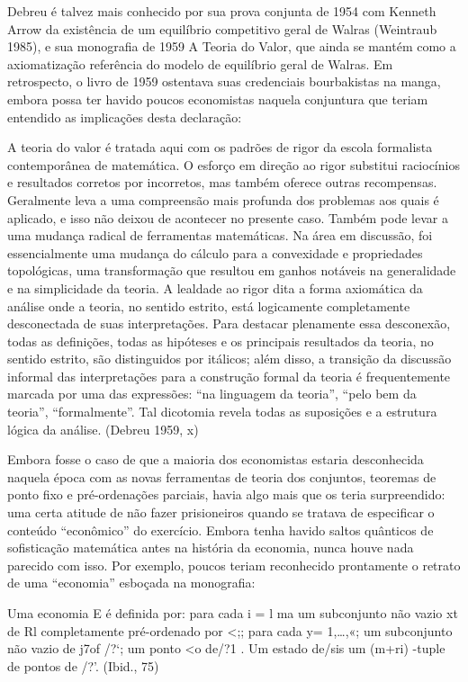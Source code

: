 \documentclass[a4paper,12pt]{article}[abntex2]
\begin{document}
Debreu é talvez mais conhecido por sua prova conjunta de 1954 com Kenneth Arrow da existência de um equilíbrio competitivo geral de Walras (Weintraub 1985), e sua monografia de 1959 A Teoria do Valor, que ainda se mantém como a axiomatização referência do modelo de equilíbrio geral de Walras. Em retrospecto, o livro de 1959 ostentava suas credenciais bourbakistas na manga, embora possa ter havido poucos economistas naquela conjuntura que teriam entendido as implicações desta declaração:

A teoria do valor é tratada aqui com os padrões de rigor da escola formalista contemporânea de matemática. O esforço em direção ao rigor substitui raciocínios e resultados corretos por incorretos, mas também oferece outras recompensas. Geralmente leva a uma compreensão mais profunda dos problemas aos quais é aplicado, e isso não deixou de acontecer no presente caso. Também pode levar a uma mudança radical de ferramentas matemáticas. Na área em discussão, foi essencialmente uma mudança do cálculo para a convexidade e propriedades topológicas, uma transformação que resultou em ganhos notáveis na generalidade e na simplicidade da teoria. A lealdade ao rigor dita a forma axiomática da análise onde a teoria, no sentido estrito, está logicamente completamente desconectada de suas interpretações. Para destacar plenamente essa desconexão, todas as definições, todas as hipóteses e os principais resultados da teoria, no sentido estrito, são distinguidos por itálicos; além disso, a transição da discussão informal das interpretações para a construção formal da teoria é frequentemente marcada por uma das expressões: “na linguagem da teoria”, “pelo bem da teoria”, “formalmente”. Tal dicotomia revela todas as suposições e a estrutura lógica da análise. (Debreu 1959, x)

Embora fosse o caso de que a maioria dos economistas estaria desconhecida naquela época com as novas ferramentas de teoria dos conjuntos, teoremas de ponto fixo e pré-ordenações parciais, havia algo mais que os teria surpreendido: uma certa atitude de não fazer prisioneiros quando se tratava de especificar o conteúdo “econômico” do exercício. Embora tenha havido saltos quânticos de sofisticação matemática antes na história da economia, nunca houve nada parecido com isso. Por exemplo, poucos teriam reconhecido prontamente o retrato de uma “economia” esboçada na monografia:

Uma economia E é definida por: para cada i = l ma um subconjunto não vazio xt de Rl completamente pré-ordenado por <;; para cada y= 1,…,«; um subconjunto não vazio de j7of /?‘; um ponto <o de/?1 . Um estado de/sis um (m+ri) -tuple de pontos de /?’. (Ibid., 75)
\end{document}
